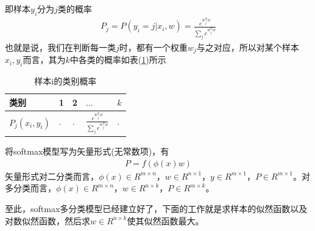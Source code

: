             即样本$y_i$分为$j$类的概率
            \begin{align*}
            P_j = P(y_i=j|x_i,w) = \frac{e^{w_j^\mathrm{T}\phi}}{\sum_j e^{w_j^\mathrm{T}\phi}}
            \end{align*}
            也就是说，我们在判断每一类$j$时，都有一个权重$w_j$与之对应，所以对某个样本$x_i,y_i$而言，其为$k$中各类的概率如表(\ref{tab:样本i的类别概率})所示
            \begin{table}[H]
              \caption{样本i的类别概率}
              \label{tab:样本i的类别概率}
              \centering
              \begin{tabular}{l|llll}
              \toprule
              类别             & 1       & 2      & $\dots$ & $k$\\
              \midrule
              $P_j(x_i,y_i)$   & $\cdot$ & $\cdot$&  $\frac{e^{w_j^\mathrm{T}\phi}}{\sum_j e^{w_j^\mathrm{T}\phi}}$   & $\cdot$ \\
              \bottomrule
              \end{tabular}
            \end{table}
            \par
            将softmax模型写为矢量形式(无常数项)，有
            \begin{align*}
            P = f \left( \phi(x)w \right)
            \end{align*}
            矢量形式对二分类而言，$\phi(x)\in R^{m\times n}$，$w\in R^{n\times 1}$，$y\in R^{m\times 1}$，$P\in R^{m\times 1}$。对多分类而言，$\phi(x)\in R^{m\times n}$，$w\in R^{n\times k}$，$P\in R^{m\times k}$。
            \par
            至此，softmax多分类模型已经建立好了，下面的工作就是求样本的似然函数以及对数似然函数，然后求$w\in R^{n\times k}$使其似然函数最大。
